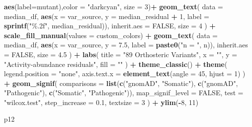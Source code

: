 \documentclass[
]{article}
\newenvironment{Shaded}{\begin{snugshade}}{\end{snugshade}}
\newcommand{\AttributeTok}[1]{\textcolor[rgb]{0.13,0.29,0.53}{#1}}
\newcommand{\ConstantTok}[1]{\textcolor[rgb]{0.56,0.35,0.01}{#1}}
\newcommand{\DecValTok}[1]{\textcolor[rgb]{0.00,0.00,0.81}{#1}}
\newcommand{\FloatTok}[1]{\textcolor[rgb]{0.00,0.00,0.81}{#1}}
\newcommand{\FunctionTok}[1]{\textcolor[rgb]{0.13,0.29,0.53}{\textbf{#1}}}
\newcommand{\NormalTok}[1]{#1}
\newcommand{\SpecialCharTok}[1]{\textcolor[rgb]{0.81,0.36,0.00}{\textbf{#1}}}
\newcommand{\StringTok}[1]{\textcolor[rgb]{0.31,0.60,0.02}{#1}}
\begin{document}
\begin{Shaded}
\begin{Highlighting}[]
    \FunctionTok{aes}\NormalTok{(}\AttributeTok{label=}\NormalTok{mutant),}\AttributeTok{color =} \StringTok{"darkcyan"}\NormalTok{, }\AttributeTok{size =} \DecValTok{3}\NormalTok{)}\SpecialCharTok{+}
  \FunctionTok{geom\_text}\NormalTok{(}
    \AttributeTok{data =}\NormalTok{ median\_df,}
    \FunctionTok{aes}\NormalTok{(}\AttributeTok{x =}\NormalTok{ var\_source, }\AttributeTok{y =}\NormalTok{ median\_residual }\SpecialCharTok{+} \DecValTok{1}\NormalTok{, }\AttributeTok{label =} \FunctionTok{sprintf}\NormalTok{(}\StringTok{"\%.2f"}\NormalTok{, median\_residual)),}
    \AttributeTok{inherit.aes =} \ConstantTok{FALSE}\NormalTok{,}
    \AttributeTok{size =} \DecValTok{4}
\NormalTok{  ) }\SpecialCharTok{+}
  \FunctionTok{scale\_fill\_manual}\NormalTok{(}\AttributeTok{values =}\NormalTok{ custom\_colors) }\SpecialCharTok{+}
  \FunctionTok{geom\_text}\NormalTok{(}
    \AttributeTok{data =}\NormalTok{ median\_df,}
    \FunctionTok{aes}\NormalTok{(}\AttributeTok{x =}\NormalTok{ var\_source, }\AttributeTok{y =} \FloatTok{7.5}\NormalTok{, }\AttributeTok{label =} \FunctionTok{paste0}\NormalTok{(}\StringTok{"n = "}\NormalTok{, n)),}
    \AttributeTok{inherit.aes =} \ConstantTok{FALSE}\NormalTok{,}
    \AttributeTok{size =} \FloatTok{4.5}
\NormalTok{  ) }\SpecialCharTok{+}
  \FunctionTok{labs}\NormalTok{(}
    \AttributeTok{title =} \StringTok{"89 Orthosteric Variants"}\NormalTok{,}
    \AttributeTok{x =} \StringTok{""}\NormalTok{,}
    \AttributeTok{y =} \StringTok{"Activity{-}abundance residuals"}\NormalTok{,}
    \AttributeTok{fill =} \StringTok{""}
\NormalTok{  ) }\SpecialCharTok{+}
  \FunctionTok{theme\_classic}\NormalTok{() }\SpecialCharTok{+}
  \FunctionTok{theme}\NormalTok{(}
    \AttributeTok{legend.position =} \StringTok{"none"}\NormalTok{,}
    \AttributeTok{axis.text.x =} \FunctionTok{element\_text}\NormalTok{(}\AttributeTok{angle =} \DecValTok{45}\NormalTok{, }\AttributeTok{hjust =} \DecValTok{1}\NormalTok{)}
\NormalTok{  ) }\SpecialCharTok{+}
  \FunctionTok{geom\_signif}\NormalTok{(}
    \AttributeTok{comparisons =} \FunctionTok{list}\NormalTok{(}\FunctionTok{c}\NormalTok{(}\StringTok{"gnomAD"}\NormalTok{, }\StringTok{"Somatic"}\NormalTok{), }
                       \FunctionTok{c}\NormalTok{(}\StringTok{"gnomAD"}\NormalTok{, }\StringTok{"Pathogenic"}\NormalTok{), }
                       \FunctionTok{c}\NormalTok{(}\StringTok{"Somatic"}\NormalTok{, }\StringTok{"Pathogenic"}\NormalTok{)),}
    \AttributeTok{map\_signif\_level =} \ConstantTok{FALSE}\NormalTok{,}
    \AttributeTok{test =} \StringTok{"wilcox.test"}\NormalTok{,}
    \AttributeTok{step\_increase =} \FloatTok{0.1}\NormalTok{,}
    \AttributeTok{textsize =} \DecValTok{3}
\NormalTok{  ) }\SpecialCharTok{+} \FunctionTok{ylim}\NormalTok{(}\SpecialCharTok{{-}}\DecValTok{8}\NormalTok{, }\DecValTok{11}\NormalTok{)}

\NormalTok{p12}
\end{Highlighting}
\end{Shaded}
\end{document}
